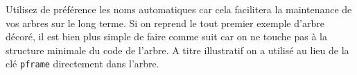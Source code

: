 \documentclass[12pt,a4paper]{article}
\begin{document}
\begin{remark}
	Utilisez de préférence les noms automatiques car cela facilitera la maintenance de vos arbres sur le long terme.
	Si on reprend le tout premier exemple d'arbre décoré, il est bien plus simple de faire comme suit car on ne touche pas à la structure minimale du code de l'arbre.
	A titre illustratif on a utilisé  au lieu de la clé \verb#pframe# directement dans l'arbre.
	
\end{remark}
\end{document}
